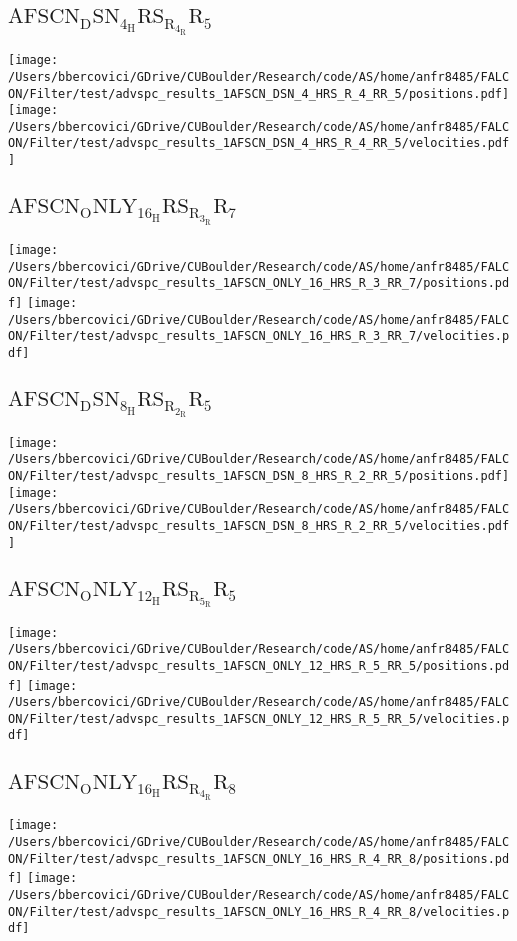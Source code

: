 \subsection{$\mathrm{AFSCN_DSN_4_HRS_R_4_RR_5}$}
\texttt{[image: /Users/bbercovici/GDrive/CUBoulder/Research/code/AS/home/anfr8485/FALCON/Filter/test/advspc\_results\_1AFSCN\_DSN\_4\_HRS\_R\_4\_RR\_5/positions.pdf]}
\texttt{[image: /Users/bbercovici/GDrive/CUBoulder/Research/code/AS/home/anfr8485/FALCON/Filter/test/advspc\_results\_1AFSCN\_DSN\_4\_HRS\_R\_4\_RR\_5/velocities.pdf]}
\subsection{$\mathrm{AFSCN_ONLY_16_HRS_R_3_RR_7}$}
\texttt{[image: /Users/bbercovici/GDrive/CUBoulder/Research/code/AS/home/anfr8485/FALCON/Filter/test/advspc\_results\_1AFSCN\_ONLY\_16\_HRS\_R\_3\_RR\_7/positions.pdf]}
\texttt{[image: /Users/bbercovici/GDrive/CUBoulder/Research/code/AS/home/anfr8485/FALCON/Filter/test/advspc\_results\_1AFSCN\_ONLY\_16\_HRS\_R\_3\_RR\_7/velocities.pdf]}
\subsection{$\mathrm{AFSCN_DSN_8_HRS_R_2_RR_5}$}
\texttt{[image: /Users/bbercovici/GDrive/CUBoulder/Research/code/AS/home/anfr8485/FALCON/Filter/test/advspc\_results\_1AFSCN\_DSN\_8\_HRS\_R\_2\_RR\_5/positions.pdf]}
\texttt{[image: /Users/bbercovici/GDrive/CUBoulder/Research/code/AS/home/anfr8485/FALCON/Filter/test/advspc\_results\_1AFSCN\_DSN\_8\_HRS\_R\_2\_RR\_5/velocities.pdf]}
\subsection{$\mathrm{AFSCN_ONLY_12_HRS_R_5_RR_5}$}
\texttt{[image: /Users/bbercovici/GDrive/CUBoulder/Research/code/AS/home/anfr8485/FALCON/Filter/test/advspc\_results\_1AFSCN\_ONLY\_12\_HRS\_R\_5\_RR\_5/positions.pdf]}
\texttt{[image: /Users/bbercovici/GDrive/CUBoulder/Research/code/AS/home/anfr8485/FALCON/Filter/test/advspc\_results\_1AFSCN\_ONLY\_12\_HRS\_R\_5\_RR\_5/velocities.pdf]}
\subsection{$\mathrm{AFSCN_ONLY_16_HRS_R_4_RR_8}$}
\texttt{[image: /Users/bbercovici/GDrive/CUBoulder/Research/code/AS/home/anfr8485/FALCON/Filter/test/advspc\_results\_1AFSCN\_ONLY\_16\_HRS\_R\_4\_RR\_8/positions.pdf]}
\texttt{[image: /Users/bbercovici/GDrive/CUBoulder/Research/code/AS/home/anfr8485/FALCON/Filter/test/advspc\_results\_1AFSCN\_ONLY\_16\_HRS\_R\_4\_RR\_8/velocities.pdf]}

